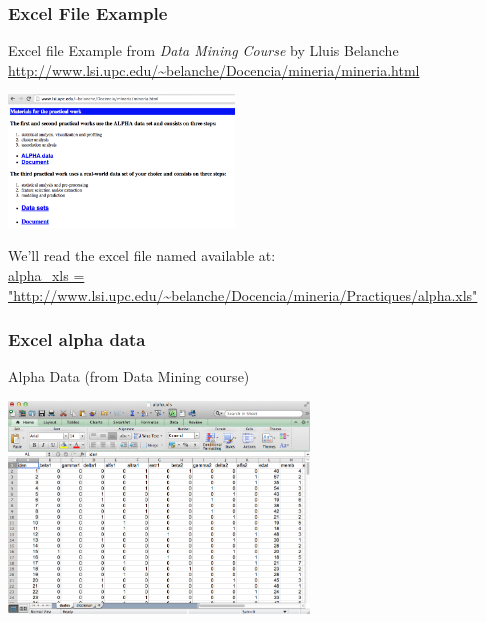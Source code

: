 \documentclass{beamer}\usepackage[]{graphicx}\usepackage[]{color}
\begin{document}
\begin{frame}[fragile]
\frametitle{Excel File Example}

\begin{block}{Excel file}
Example from \textit{Data Mining Course} by Lluis Belanche \\
{\scriptsize 
\url{http://www.lsi.upc.edu/~belanche/Docencia/mineria/mineria.html}}

\begin{center}
\includegraphics[width=6cm]{images/mineria_webpage.png}
\end{center}

We'll read the excel file named  available at: \\
{\tiny 
\url{alpha_xls = "http://www.lsi.upc.edu/~belanche/Docencia/mineria/Practiques/alpha.xls"
}}
\end{block}

\end{frame}


\begin{frame}
\frametitle{Excel alpha data}

Alpha Data (from Data Mining course)
\begin{center}
\includegraphics[width=8cm]{images/alpha_data.png}
\end{center}

\end{frame}

\end{document}
